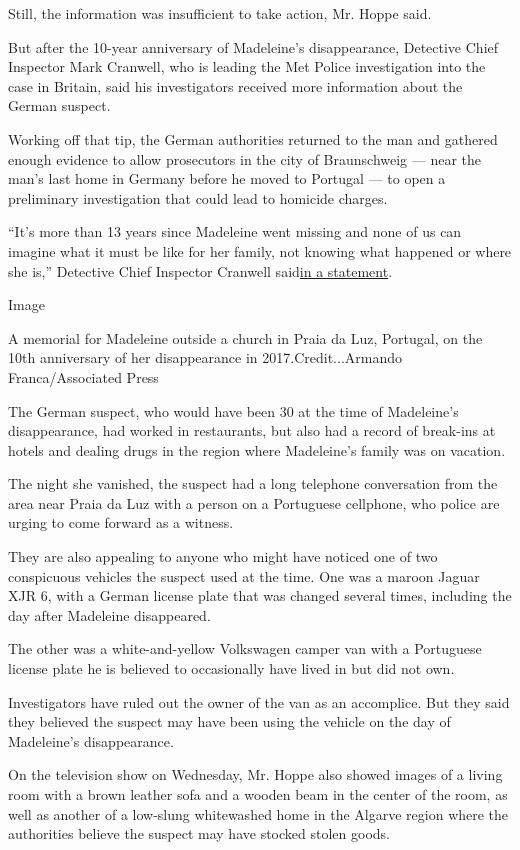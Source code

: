 Still, the information was insufficient to take action, Mr. Hoppe said.

But after the 10-year anniversary of Madeleine's disappearance,
Detective Chief Inspector Mark Cranwell, who is leading the Met Police
investigation into the case in Britain, said his investigators received
more information about the German suspect.

Working off that tip, the German authorities returned to the man and
gathered enough evidence to allow prosecutors in the city of
Braunschweig --- near the man's last home in Germany before he moved to
Portugal --- to open a preliminary investigation that could lead to
homicide charges.

``It's more than 13 years since Madeleine went missing and none of us
can imagine what it must be like for her family, not knowing what
happened or where she is,'' Detective Chief Inspector Cranwell
said\href{http://news.met.police.uk/news/operation-grange-update-and-appeal-403826}{in
a statement}.

Image

A memorial for Madeleine outside a church in Praia da Luz, Portugal, on
the 10th anniversary of her disappearance in 2017.Credit...Armando
Franca/Associated Press

The German suspect, who would have been 30 at the time of Madeleine's
disappearance, had worked in restaurants, but also had a record of
break-ins at hotels and dealing drugs in the region where Madeleine's
family was on vacation.

The night she vanished, the suspect had a long telephone conversation
from the area near Praia da Luz with a person on a Portuguese cellphone,
who police are urging to come forward as a witness.

They are also appealing to anyone who might have noticed one of two
conspicuous vehicles the suspect used at the time. One was a maroon
Jaguar XJR 6, with a German license plate that was changed several
times, including the day after Madeleine disappeared.

The other was a white-and-yellow Volkswagen camper van with a Portuguese
license plate he is believed to occasionally have lived in but did not
own.

Investigators have ruled out the owner of the van as an accomplice. But
they said they believed the suspect may have been using the vehicle on
the day of Madeleine's disappearance.

On the television show on Wednesday, Mr. Hoppe also showed images of a
living room with a brown leather sofa and a wooden beam in the center of
the room, as well as another of a low-slung whitewashed home in the
Algarve region where the authorities believe the suspect may have
stocked stolen goods.

